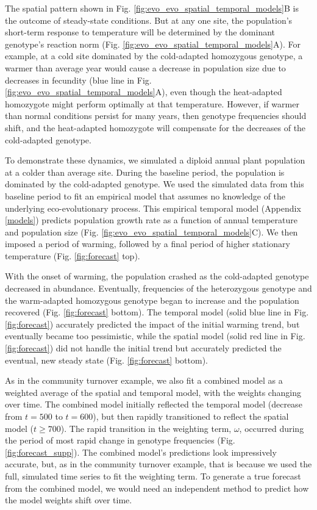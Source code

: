 \documentclass[11pt]{article}
\begin{document}
The spatial pattern shown in Fig. \ref{fig:evo_evo_spatial_temporal_models}B is the outcome of steady-state conditions. But at any one site, the population's short-term response to temperature will be determined by the dominant genotype's reaction norm (Fig. \ref{fig:evo_evo_spatial_temporal_models}A). For example, at a cold site dominated by the cold-adapted homozygous genotype, a warmer than average year would cause a decrease in population size due to decreases in fecundity (blue line in Fig. \ref{fig:evo_evo_spatial_temporal_models}A), even though the heat-adapted homozygote might perform optimally at that temperature. However, if warmer than normal conditions persist for many years, then genotype frequencies should shift, and the heat-adapted homozygote will compensate for the decreases of the cold-adapted genotype. 

To demonstrate these dynamics, we simulated a diploid annual plant population at a colder than average site. During the baseline period, the population is dominated by the cold-adapted genotype. We used the simulated data from this baseline period to fit an empirical model that assumes no knowledge of the underlying eco-evolutionary process. This empirical temporal model (Appendix \ref{models}) predicts population growth rate as a function of annual temperature and population size (Fig. \ref{fig:evo_evo_spatial_temporal_models}C). We then imposed a period of warming, followed by a final period of higher stationary temperature (Fig. \ref{fig:forecast} top).

With the onset of warming, the population crashed as the cold-adapted genotype decreased in abundance. Eventually, frequencies of the heterozygous genotype and the warm-adapted homozygous genotype began to increase and the population recovered (Fig. \ref{fig:forecast} bottom). The temporal model (solid blue line in Fig. \ref{fig:forecast}) accurately predicted the impact of the initial warming trend, but eventually became too pessimistic, while the spatial model (solid red line in Fig. \ref{fig:forecast}) did not handle the initial trend but accurately predicted the eventual, new steady state (Fig. \ref{fig:forecast} bottom).

As in the community turnover example, we also fit a combined model as a weighted average of the spatial and temporal model, with the weights changing over time. The combined model initially reflected the temporal model (decrease from $t=500$ to $t=600$), but then rapidly transitioned to reflect the spatial model ($t \geq 700$). The rapid transition in the weighting term, $\omega$, occurred during the period of most rapid change in genotype frequencies (Fig. \ref{fig:forecast_supp}). The combined model's predictions look impressively accurate, but, as in the community turnover example, that is because we used the full, simulated time series to fit the weighting term. To generate a true forecast from the combined model, we would need an independent method to predict how the model weights shift over time.
\end{document}
